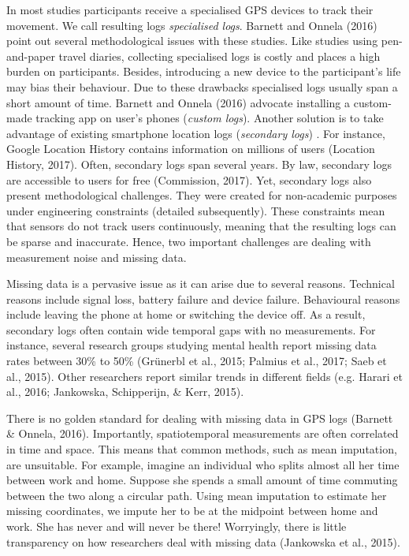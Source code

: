 \documentclass[english,man]{apa6}
\theoremstyle{definition}
\theoremstyle{definition}
\theoremstyle{definition}
\theoremstyle{remark}
\begin{document}
In most studies participants receive a specialised GPS devices to track
their movement. We call resulting logs \emph{specialised logs}. Barnett
and Onnela (2016) point out several methodological issues with these
studies. Like studies using pen-and-paper travel diaries, collecting
specialised logs is costly and places a high burden on participants.
Besides, introducing a new device to the participant's life may bias
their behaviour. Due to these drawbacks specialised logs usually span a
short amount of time. Barnett and Onnela (2016) advocate installing a
custom-made tracking app on user's phones (\emph{custom logs}). Another
solution is to take advantage of existing smartphone location logs
(\emph{secondary logs}) . For instance, Google Location History contains
information on millions of users (Location History, 2017). Often,
secondary logs span several years. By law, secondary logs are accessible
to users for free (Commission, 2017). Yet, secondary logs also present
methodological challenges. They were created for non-academic purposes
under engineering constraints (detailed subsequently). These constraints
mean that sensors do not track users continuously, meaning that the
resulting logs can be sparse and inaccurate. Hence, two important
challenges are dealing with measurement noise and missing data.

Missing data is a pervasive issue as it can arise due to several
reasons. Technical reasons include signal loss, battery failure and
device failure. Behavioural reasons include leaving the phone at home or
switching the device off. As a result, secondary logs often contain wide
temporal gaps with no measurements. For instance, several research
groups studying mental health report missing data rates between 30\% to
50\% (Grünerbl et al., 2015; Palmius et al., 2017; Saeb et al., 2015).
Other researchers report similar trends in different fields (e.g.
Harari et al., 2016; Jankowska, Schipperijn, \& Kerr, 2015).

There is no golden standard for dealing with missing data in GPS logs
(Barnett \& Onnela, 2016). Importantly, spatiotemporal measurements are
often correlated in time and space. This means that common methods, such
as mean imputation, are unsuitable. For example, imagine an individual
who splits almost all her time between work and home. Suppose she spends
a small amount of time commuting between the two along a circular path.
Using mean imputation to estimate her missing coordinates, we impute her
to be at the midpoint between home and work. She has never and will
never be there! Worryingly, there is little transparency on how
researchers deal with missing data (Jankowska et al., 2015).
\end{document}
